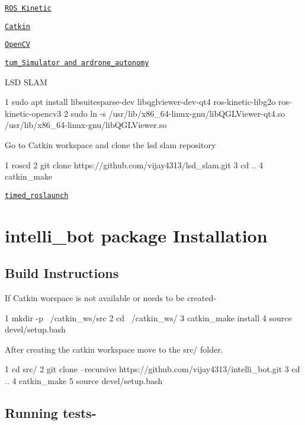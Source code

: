 \begin{DoxyItemize}
\item \href{http://wiki.ros.org/kinetic/Installation}{\tt R\+OS Kinetic}
\item \href{http://wiki.ros.org/catkin}{\tt Catkin}
\item \href{https://docs.opencv.org/2.4/doc/tutorials/introduction/linux_install/linux_install.html}{\tt Open\+CV}
\item \href{http://wiki.ros.org/tum_simulator}{\tt tum\+\_\+\+Simulator and ardrone\+\_\+autonomy}
\item L\+SD S\+L\+AM 
\begin{DoxyCode}
1 sudo apt install libsuitesparse-dev libqglviewer-dev-qt4 ros-kinetic-libg2o  ros-kinetic-opencv3
2 sudo ln -s /usr/lib/x86\_64-linux-gnu/libQGLViewer-qt4.so /usr/lib/x86\_64-linux-gnu/libQGLViewer.so
\end{DoxyCode}
 Go to Catkin workspace and clone the lsd slam repository 
\begin{DoxyCode}
1 roscd
2 git clone https://github.com/vijay4313/lsd\_slam.git
3 cd ..
4 catkin\_make
\end{DoxyCode}

\item \href{http://wiki.ros.org/timed_roslaunch}{\tt timed\+\_\+roslaunch}
\end{DoxyItemize}

\section*{intelli\+\_\+bot package Installation}

\subsection*{Build Instructions}

If Catkin worspace is not available or needs to be created-\/ 
\begin{DoxyCode}
1 mkdir -p ~/catkin\_ws/src
2 cd ~/catkin\_ws/
3 catkin\_make install
4 source devel/setup.bash
\end{DoxyCode}
 After creating the catkin workspace move to the src/ folder. 
\begin{DoxyCode}
1 cd src/
2 git clone --recursive https://github.com/vijay4313/intelli\_bot.git
3 cd ..
4 catkin\_make
5 source devel/setup.bash
\end{DoxyCode}


\subsection*{Running tests-\/}

